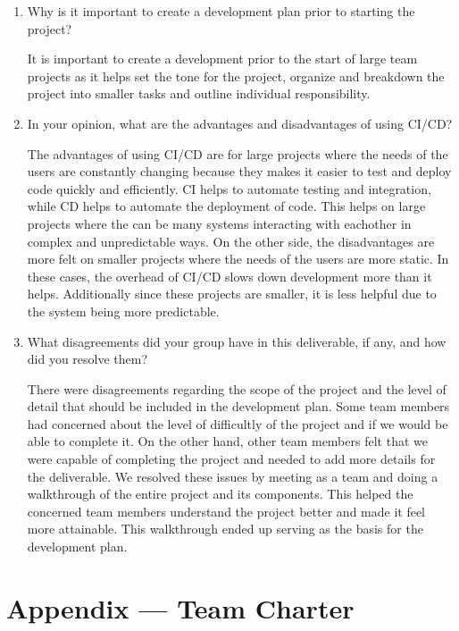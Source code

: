 \documentclass{article}
\begin{document}
\begin{enumerate}
    \item Why is it important to create a development plan prior to starting the
    project?

    It is important to create a development prior to the start of large team projects as it helps set the tone for the project, organize and breakdown the project into smaller tasks and outline individual responsibility. 

    \item In your opinion, what are the advantages and disadvantages of using
    CI/CD?

    The advantages of using CI/CD are for large projects where the needs of the users are constantly changing because they makes it easier to test and deploy code quickly and efficiently.
    CI helps to automate testing and integration, while CD helps to automate the deployment of code.
    This helps on large projects where the can be many systems interacting with eachother in complex and unpredictable ways.
    On the other side, the disadvantages are more felt on smaller projects where the needs of the users are more static.
    In these cases, the overhead of CI/CD slows down development more than it helps.
    Additionally since these projects are smaller, it is less helpful due to the system being more predictable.


    \item What disagreements did your group have in this deliverable, if any,
    and how did you resolve them?

    There were disagreements regarding the scope of the project and the level of detail that should be included in the development plan. 
    Some team members had concerned about the level of difficultly of the project and if we would be able to complete it. On the other hand,
    other team members felt that we were capable of completing the project and needed to add more details for the deliverable.
    We resolved these issues by meeting as a team and doing a walkthrough of the entire project and its components.
    This helped the concerned team members understand the project better and made it feel more attainable. 
    This walkthrough ended up serving as the basis for the development plan.
    
\end{enumerate}

\newpage{}

\section*{Appendix --- Team Charter}
\end{document}
